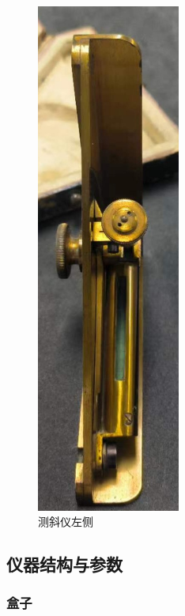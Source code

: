 \documentclass[UTF8]{ctexart}
\begin{document}
\begin{figure}[h]
    \begin{minipage}[t]{0.2\textwidth}
        \centering
        \includegraphics[width=0.42\textwidth]{img/clinometer_surface_left.jpg}
        \caption{测斜仪左侧}
    \label{fig:clinometer_surface_left}
    \end{minipage}
\end{figure}

\subsection{仪器结构与参数}

\subsubsection{盒子}
\end{document}
